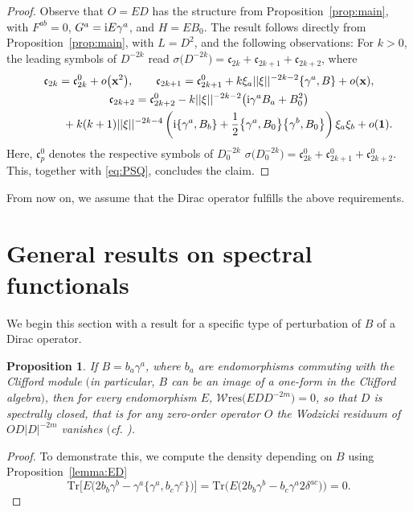 \documentclass[pdftex]{sigma}
\numberwithin{equation}{section}
\newtheorem{Proposition}[Theorem]{Proposition}
\theoremstyle{definition}
\def\W{\mathscr{W} \mathrm{res}}
\def\Tr{\mathrm{Tr}}
\begin{document}
\begin{proof}
	Observe that $O = ED$ has the structure from Proposition~\ref{prop:main}, with $F^{ab} = 0$, $G^a = {\rm i}E\gamma^a$, and $H = EB_0$. The result follows directly from Proposition~\ref{prop:main}, with $L = D^2$, and the following observations: For $k > 0$, the leading symbols of $D^{-2k}$ read
$\sigma\bigl(D^{-2k}\bigr)=\mathfrak{c}_{2k}+\mathfrak{c}_{2k+1}+\mathfrak{c}_{2k+2}$,
where%
\begin{gather*}%
		\mathfrak c_{2k} = \mathfrak c^0_{2k} + o\bigl({\bf x}^2\bigr),\qquad
		\mathfrak c_{2k+1}= \mathfrak c^0_{2k+1}+k \xi_a||\xi||^{-2k-2} \{\gamma^a,B\} + o({\bf x}),\\
		\mathfrak c_{2k+2}= \mathfrak c^0_{2k+2}-k||\xi||^{-2k-2} \bigl({\rm i}\gamma^aB_a+B^2_0\bigr) \\
		 \phantom{\mathfrak c_{2k+2}=}{} +k(k+1) ||\xi||^{-2k-4}\left({\rm i}\{\gamma^a,B_b\}+\frac12\bigl\{\gamma^a,B_0\bigr\}\bigl\{\gamma^b,B_0\bigr\}\right) \xi_a \xi_b + o({\bf 1}).
\end{gather*}
Here, $\mathfrak{c}_p^0$ denotes the respective symbols of $D_0^{-2k}$
$\sigma\bigl(D_0^{-2k}\bigr) = \mathfrak{c}_{2k}^0 + \mathfrak{c}_{2k+1}^0 + \mathfrak{c}_{2k+2}^0$. This, together with \eqref{eq:PSQ}, concludes the claim.
\end{proof}

From now on, we assume that the Dirac operator fulfills the above requirements.

\section{General results on spectral functionals}

We begin this section with a result for a specific type of perturbation of $B$ of a Dirac operator.
\begin{Proposition}
	\label{rem:0}
	If $B= b_a\gamma^a$, where $b_a$ are endomorphisms commuting with the Clifford module $($in particular, $B$ can be an image of a one-form in the Clifford algebra$)$, then for every endomorphism $E$, $\W\bigl(EDD^{-2m}\bigr) = 0$, so that $D$ is spectrally closed, that is for any zero-order operator $O$ the Wodzicki residuum of $OD|D|^{-2m}$ vanishes $($cf. {\rm\cite[\emph{Definition}~5.5]{dabrowski2023})}.
\end{Proposition}
\begin{proof}
	To demonstrate this, we compute the density depending on $B$ using Proposition~\ref{lemma:ED}
	\[
		\Tr\bigl[E \bigl(2 b_b\gamma^b - \gamma^a
		\{\gamma^a,b_c\gamma^c\}\bigr)\bigr]
		=\Tr\bigl( E \bigl( 2 b_b \gamma^b -
		b_c \gamma^a 2 \delta^{ac} \bigr) \bigr) =0.\tag*{\qed}
	\]\renewcommand{\qed}{}
\end{proof}
\end{document}
